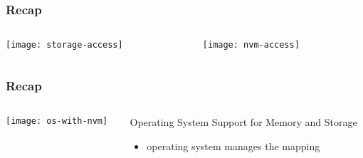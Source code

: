 \begin{frame}[plain]
	\frametitle{Recap}



	\begin{columns}

	\begin{column}{.5\textwidth}
	
	\texttt{[image: storage-access]}
	
	\end{column}

	\begin{column}{.5\textwidth}
	

	\texttt{[image: nvm-access]}		
	\end{column}
	

\end{columns}


\end{frame}


\begin{frame}[plain]
	\frametitle{Recap}
	
	
	
			
	\begin{columns}
    
    \begin{column}{.5\textwidth}
        
        \texttt{[image: os-with-nvm]}
        
    \end{column}
    
    \begin{column}{.5\textwidth}
        
        \Large
        Operating System Support for Memory and Storage	
        \begin{itemize}

            \item operating system manages the mapping

        \end{itemize}	
        		
    \end{column}
    
    
\end{columns}		

	
	
\end{frame}

